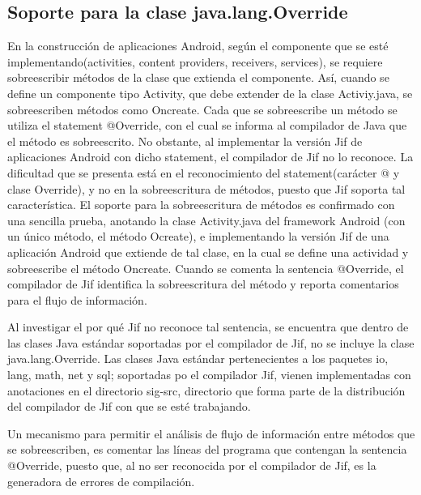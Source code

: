 \subsection{Soporte para la clase java.lang.Override}
\label{sub:override}
En la construcción de aplicaciones Android, según el componente que se esté
implementando(activities, content providers, receivers, services), se requiere
sobreescribir métodos de la clase que extienda el componente. Así, cuando se
define un componente tipo Activity, que debe extender de la clase Activiy.java, 
se sobreescriben métodos como Oncreate. Cada que se sobreescribe
un método se utiliza el statement @Override, con el cual se informa al
compilador de Java que el método es sobreescrito. No obstante, al implementar la
versión Jif de aplicaciones Android con dicho statement, el compilador de Jif
no lo reconoce. La dificultad que se presenta está en el reconocimiento del
statement(carácter @ y clase Override), y no en la sobreescritura de métodos,
puesto que Jif soporta tal característica.\newline 
El soporte para la sobreescritura de
métodos es confirmado con una sencilla prueba, anotando la clase Activity.java
del framework Android (con un único método, el método Ocreate), e implementando
la versión Jif de una aplicación Android que extiende de tal clase, en la cual
se define una actividad y sobreescribe el método Oncreate.
Cuando se comenta la sentencia @Override, el compilador de Jif identifica la
sobreescritura del método y reporta comentarios para el flujo de información.

Al investigar el por qué Jif no reconoce tal sentencia, se encuentra que dentro
de las clases Java estándar soportadas por el compilador de Jif, no se incluye
la clase java.lang.Override.\newline 
Las clases Java estándar pertenecientes a los paquetes io, lang, math, net y
sql; soportadas po el compilador Jif, vienen implementadas con anotaciones en el
directorio sig-src, directorio que forma parte de la distribución del compilador
de Jif con que se esté trabajando.

Un mecanismo para permitir el análisis de flujo de información entre métodos
que se sobreescriben, es comentar las líneas del programa que contengan la
sentencia @Override, puesto que, al no ser reconocida por el compilador de Jif,
es la generadora de errores de compilación.

